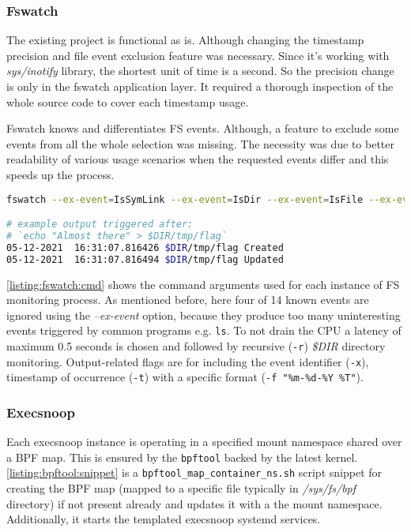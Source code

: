 \subsubsection*{Fswatch \label{implementation:mon:hunting:fswatch}}
The existing project is functional as is. Although changing the timestamp precision and file event exclusion feature was necessary. Since it's working with \textit{sys/inotify} library, the shortest unit of time is a second. So the precision change is only in the fswatch application layer. It required a thorough inspection of the whole source code to cover each timestamp usage.

Fswatch knows and differentiates FS events. Although, a feature to exclude some events from all the whole selection was missing. The necessity was due to better readability of various usage scenarios when the requested events differ and this speeds up the process.

\begin{lstlisting}[language=bash, style=custom, caption={}, label=listing:fswatch:cmd]
fswatch --ex-event=IsSymLink --ex-event=IsDir --ex-event=IsFile --ex-event=PlatformSpecific -l 0.5 -r -x -t -f "%m-%d-%Y  %T" $DIR

# example output triggered after:
# `echo "Almost there" > $DIR/tmp/flag`
05-12-2021  16:31:07.816426 $DIR/tmp/flag Created
05-12-2021  16:31:07.816494 $DIR/tmp/flag Updated
\end{lstlisting}
\autoref{listing:fswatch:cmd} shows the command arguments used for each instance of FS monitoring process. As mentioned before, here four of 14 known events are ignored using the \textit{--ex-event} option, because they produce too many uninteresting events triggered by common programs e.g. \texttt{ls}. To not drain the CPU a latency of maximum 0.5 seconds is chosen and followed by recursive (\texttt{-r}) \textit{\$DIR} directory monitoring. Output-related flags are for including the event identifier (\texttt{-x}), timestamp of occurrence (\texttt{-t}) with a specific format (\texttt{-f "\%m-\%d-\%Y  \%T"}).

\subsubsection*{Execsnoop \label{implementation:mon:hunting:execsnoop}}
Each execsnoop instance is operating in a specified mount namespace shared over a BPF map. This is ensured by the \texttt{bpftool} backed by the latest kernel. \autoref{listing:bpftool:snippet} is a \texttt{bpftool\_map\_container\_ns.sh} script snippet for creating the BPF map (mapped to a specific file typically in \textit{/sys/fs/bpf} directory) if not present already and updates it with a the mount namespace. Additionally, it starts the templated execsnoop systemd services.

